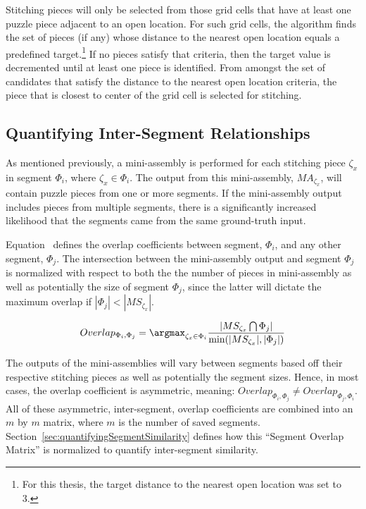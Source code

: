 Stitching pieces will only be selected from those grid cells that have at least one puzzle piece adjacent to an open location. For such grid cells, the algorithm finds the set of pieces (if any) whose distance to the nearest open location equals a predefined target.\footnote{For this thesis, the target distance to the nearest open location was set to 3.}  If no pieces satisfy that criteria, then the target value is decremented until at least one piece is identified. From amongst the set of candidates that satisfy the distance to the nearest open location criteria, the piece that is closest to center of the grid cell is selected for stitching. 

\subsection{Quantifying Inter-Segment Relationships}

As mentioned previously, a mini-assembly is performed for each stitching piece $\zeta_x$ in segment $\Phi_i$, where $\zeta_x \in \Phi_i$.  The output from this mini-assembly, $MA_{\zeta_x}$, will contain puzzle pieces from one or more segments.  If the mini-assembly output includes pieces from multiple segments, there is a significantly increased likelihood that the segments came from the same ground-truth input. 

Equation~ defines the overlap coefficients between segment, $\Phi_i$, and any other segment, $\Phi_j$. The intersection between the mini-assembly output and segment $\Phi_j$ is normalized with respect to both the the number of pieces in mini-assembly as well as potentially the size of segment $\Phi_j$, since the latter will dictate the maximum overlap if $|\Phi_j| < |MS_{\zeta_x}|$.  

\begin{equation} \label{eq:segmentOverlap}
Overlap_{\Phi_i,\Phi_j} = \argmax_{\zeta_x \in \Phi_i} {\frac{|MS_{\zeta_x} \bigcap \Phi_j|}{\text{min}(|MS_{\zeta_x}|, |\Phi_j|)}}
\end{equation}

The outputs of the mini-assemblies will vary between segments based off their respective stitching pieces as well as potentially the segment sizes.  Hence, in most cases, the overlap coefficient is asymmetric, meaning: $Overlap_{\Phi_i,\Phi_j} \neq Overlap_{\Phi_j,\Phi_i}$.  All of these asymmetric, inter-segment, overlap coefficients are combined into an $m$ by $m$ matrix, where $m$ is the number of saved segments.  Section~\ref{sec:quantifyingSegmentSimilarity} defines how this ``Segment Overlap Matrix'' is normalized to quantify inter-segment similarity.  


